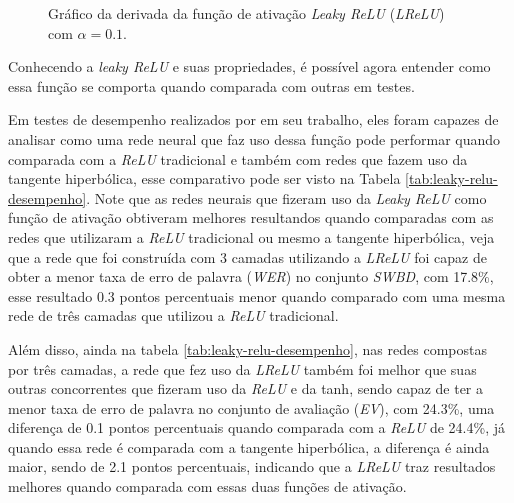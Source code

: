 \begin{figure}[h!]
    \centering
    \caption{Gráfico da derivada da função de ativação \textit{Leaky ReLU} (\textit{LReLU}) com $\alpha = 0.1$.}
    \label{fig:leaky-relu-derivada}
\end{figure}

Conhecendo a \textit{leaky ReLU} e suas propriedades, é possível agora entender como essa função se comporta quando comparada com outras em testes.

Em testes de desempenho realizados por \textcite{LeakyReLUArticle} em seu trabalho, eles foram capazes de analisar como uma rede neural que faz uso dessa função pode performar quando comparada com a \textit{ReLU} tradicional e também com redes que fazem uso da tangente hiperbólica, esse comparativo pode ser visto na Tabela \ref{tab:leaky-relu-desempenho}. Note que as redes neurais que fizeram uso da \textit{Leaky ReLU} como função de ativação obtiveram melhores resultandos quando comparadas com as redes que utilizaram a \textit{ReLU} tradicional ou mesmo a tangente hiperbólica, veja que a rede que foi construída com 3 camadas utilizando a \textit{LReLU} foi capaz de obter a menor taxa de erro de palavra (\textit{WER}) no conjunto \textit{SWBD}, com 17.8\%, esse resultado 0.3 pontos percentuais menor quando comparado com uma mesma rede de três camadas que utilizou a \textit{ReLU} tradicional.

Além disso, ainda na tabela \ref{tab:leaky-relu-desempenho}, nas redes compostas por três camadas, a rede que fez uso da \textit{LReLU} também foi melhor que suas outras concorrentes que fizeram uso da \textit{ReLU} e da tanh, sendo capaz de ter a menor taxa de erro de palavra no conjunto de avaliação (\textit{EV}), com 24.3\%, uma diferença de 0.1 pontos percentuais quando comparada com a \textit{ReLU} de 24.4\%, já quando essa rede é comparada com a tangente hiperbólica, a diferença é ainda maior, sendo de 2.1 pontos percentuais, indicando que a \textit{LReLU} traz resultados melhores quando comparada com essas duas funções de ativação.

